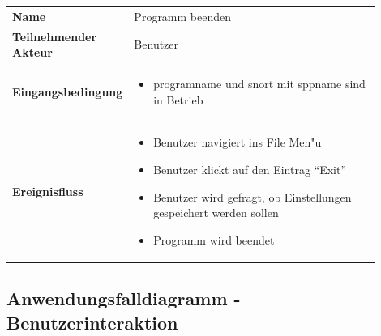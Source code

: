 \begin{tabular}{lp{0.9\linewidth}}
\textbf{Name} & Programm beenden \\

\textbf{Teilnehmender Akteur} & Benutzer \\

\textbf{Eingangsbedingung} &
				\begin{minipage}[t]{\linewidth}
				\begin{itemize}[nosep,after=\strut,leftmargin=10pt]

				\item \gls{programname} und \gls{snort} mit \gls{sppname} sind in Betrieb

				\end{itemize}
				\end{minipage} \\
\textbf{Ereignisfluss} &
				\begin{minipage}[t]{\linewidth}
				\begin{itemize}[nosep,after=\strut,leftmargin=10pt]
				\item Benutzer navigiert ins File Men"u
				\item Benutzer klickt auf den Eintrag ``Exit''
				\item Benutzer wird gefragt, ob Einstellungen gespeichert werden sollen
				\item Programm wird beendet
				\end{itemize}
				\end{minipage} \\
\end{tabular}

\pagebreak

\subsection*{Anwendungsfalldiagramm - Benutzerinteraktion}

